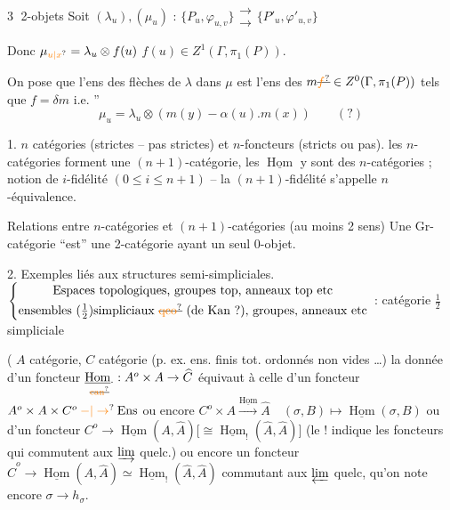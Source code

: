 \textcircled{3} 2-objets \quad Soit $(\lambda_u),(\mu_u)$ \deleted{$\unsure{\leftrightarrow|\to}$} :
$\{P_u,\varphi_{u,v}\}\mathrel{\substack{\longrightarrow\\[-4pt]\longrightarrow}}\{P'_u,\varphi'_{u,v}\}$

Donc $\mu_{\unsure{u|x}}=\lambda_u\otimes f(u)$ \quad $f(u)\in Z^1(\Gamma,\pi_1(P))$.

On pose que l'ens des flèches de
 $\lambda$ dans $\mu$ est l'ens des $m\deleted{\unsure{f}}\in Z^0(\Gamma,\pi_1(P))$
tels que $f=\delta m$ i.e.
\hfill\textquotedblright
\[
\mu_u=\lambda_u\otimes(m(y)-\alpha(u).m(x))\qquad(?)
\]

1. $n$ catégories (strictes -- pas strictes) et $n$-foncteurs (stricts ou pas).
les $n$-catégories forment une $(n+1)$-catégorie, les $\underline{\operatorname{Hom}}$ y sont des
$n$-catégories ; notion de $i$-fidélité $(0\leq i\leq n+1)$ -- la $(n+1)$-fidélité
s'appelle $n$-équivalence.

Relations entre $n$-catégories et $(n+1)$-catégories  (au moins  2 sens)
Une Gr-catégorie ``est'' une 2-catégorie ayant un seul 0-objet.

2. Exemples liés aux structures semi-simpliciales.
$\left\{\begin{gathered}\text{Espaces topologiques, groupes top, anneaux top etc}\\
\text{ensembles }(\tfrac12)\text{simpliciaux }\deleted{\text{\unsure{qco}}}\text{ (de Kan ?), groupes, anneaux etc}\end{gathered}\right.$
 : catégorie $\frac12$ simpliciale

( $A$ catégorie, $C$  catégorie (p. ex. ens. finis tot. ordonnés non vides \ldots)
la donnée d'un foncteur $\underset{\deleted{\unsure{\rm can}}}{\underline{\operatorname{Hom}}_{\cdot}}:A^o\times A\to\widehat C$
équivaut à celle d'un foncteur $A^o\times A\times C^o\mathbin{\unsure{-|\to}}\mathrm{Ens}$ ou encore
$C^o\times A\xrightarrow{\underline{\operatorname{Hom}}}\widehat A\quad(\sigma,B)\mapsto\underline{\operatorname{Hom}}(\sigma,B)$ ou d'un foncteur \inserted{$\sigma\mathbin{-}\varphi_\sigma$}
$C^o\longrightarrow\underline{\operatorname{Hom}}(A,\widehat A)\bigl[\cong\underline{\operatorname{Hom}}_{!}(\widehat A,\widehat A)\bigr]$ (le $!$ indique les
foncteurs qui commutent aux $\varinjlim$ quelc.)  ou
encore un foncteur $\widehat{C}^{o}\to\underline{\operatorname{Hom}}(A,\widehat A)\simeq\underline{\operatorname{Hom}}_{!}(\widehat A,\widehat A)$
commutant aux $\varprojlim$ quelc, qu'on note encore $\sigma\to h_\sigma$.

